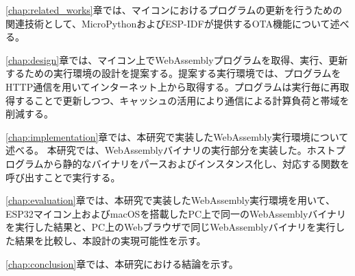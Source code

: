 \ref{chap:related_works}章では、マイコンにおけるプログラムの更新を行うための関連技術として、MicroPythonおよびESP-IDFが提供するOTA機能について述べる。

\ref{chap:design}章では、マイコン上でWebAssemblyプログラムを取得、実行、更新するための実行環境の設計を提案する。提案する実行環境では、プログラムをHTTP通信を用いてインターネット上から取得する。プログラムは実行毎に再取得することで更新しつつ、キャッシュの活用により通信による計算負荷と帯域を削減する。

\ref{chap:implementation}章では、本研究で実装したWebAssembly実行環境について述べる。
本研究では、WebAssemblyバイナリの実行部分を実装した。ホストプログラムから静的なバイナリをパースおよびインスタンス化し、対応する関数を呼び出すことで実行する。

\ref{chap:evaluation}章では、本研究で実装したWebAssembly実行環境を用いて、ESP32マイコン上およびmacOSを搭載したPC上で同一のWebAssemblyバイナリを実行した結果と、PC上のWebブラウザで同じWebAssemblyバイナリを実行した結果を比較し、本設計の実現可能性を示す。

\ref{chap:conclusion}章では、本研究における結論を示す。
